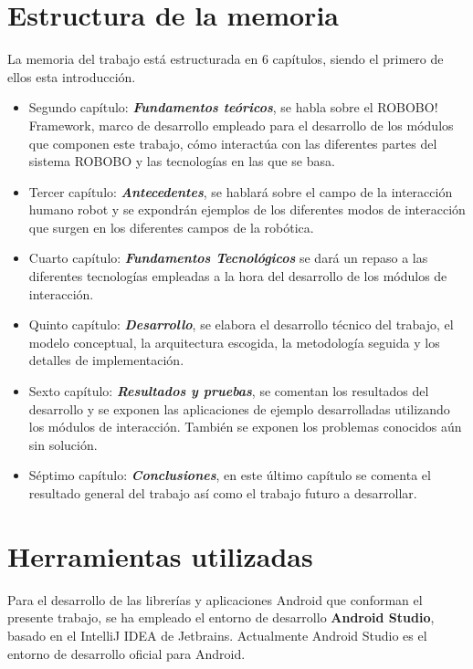  \section{Estructura de la memoria}
 \label{sec:intro-memory-structure}
 La memoria del trabajo está estructurada en 6 capítulos, siendo el primero de ellos esta introducción.
 \begin{itemize}
 	\item Segundo capítulo: \textbf{\textit{Fundamentos teóricos}}, se habla sobre el ROBOBO! Framework, marco de desarrollo empleado para el desarrollo de los módulos que componen este trabajo, cómo interactúa con las diferentes partes del sistema ROBOBO y las tecnologías en las que se basa.
 	
 	\item Tercer capítulo: \textbf{\textit{Antecedentes}}, se hablará sobre el campo de la interacción humano robot y se expondrán ejemplos de los diferentes modos de interacción que surgen en los diferentes campos de la robótica. 
 	\item Cuarto capítulo: \textbf{\textit{Fundamentos Tecnológicos}} se dará un repaso a las diferentes tecnologías empleadas a la hora del desarrollo de los módulos de interacción.
 	
 	\item Quinto capítulo: \textbf{\textit{Desarrollo}}, se elabora el desarrollo técnico del trabajo, el modelo conceptual, la arquitectura escogida, la metodología seguida y los detalles de implementación. 
 	
 	\item Sexto capítulo: \textbf{\textit{Resultados y pruebas}}, se comentan los resultados del desarrollo y se exponen las aplicaciones de ejemplo desarrolladas utilizando los módulos de interacción. También se exponen los problemas conocidos aún sin solución.
 
 	\item Séptimo capítulo: \textbf{\textit{Conclusiones}}, en este último capítulo se comenta el resultado general del trabajo así como el trabajo futuro a desarrollar.


 \end{itemize}
 
 \section{Herramientas utilizadas}
  \label{sec:intro-tools}
 Para el desarrollo de las librerías y aplicaciones Android que conforman el presente trabajo, se ha empleado el entorno de desarrollo \textbf{Android Studio}, basado en el IntelliJ IDEA de Jetbrains. Actualmente Android Studio es el entorno de desarrollo oficial para Android.
 
